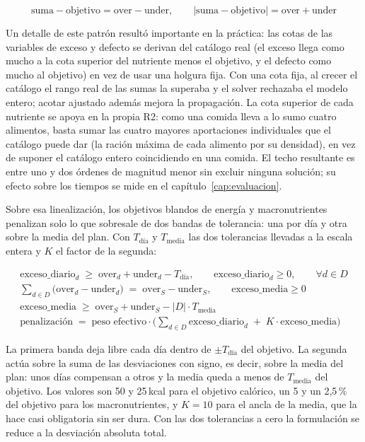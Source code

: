 \begin{equation*}
\text{suma} - \text{objetivo} = \text{over} - \text{under}, \qquad |\text{suma} - \text{objetivo}| = \text{over} + \text{under}
\end{equation*}

Un detalle de este patrón resultó importante en la práctica: las cotas de las variables de exceso y defecto se derivan del catálogo real (el exceso llega como mucho a la cota superior del nutriente menos el objetivo, y el defecto como mucho al objetivo) en vez de usar una holgura fija. Con una cota fija, al crecer el catálogo el rango real de las sumas la superaba y el solver rechazaba el modelo entero; acotar ajustado además mejora la propagación. La cota superior de cada nutriente se apoya en la propia R2: como una comida lleva a lo sumo cuatro alimentos, basta sumar las cuatro mayores aportaciones individuales que el catálogo puede dar (la ración máxima de cada alimento por su densidad), en vez de suponer el catálogo entero coincidiendo en una comida. El techo resultante es entre uno y dos órdenes de magnitud menor sin excluir ninguna solución; su efecto sobre los tiempos se mide en el capítulo~\ref{cap:evaluacion}.

Sobre esa linealización, los objetivos blandos de energía y macronutrientes penalizan solo lo que sobresale de dos bandas de tolerancia: una por día y otra sobre la media del plan. Con $T_{\text{día}}$ y $T_{\text{media}}$ las dos tolerancias llevadas a la escala entera y $K$ el factor de la segunda:

\begin{gather*}
\text{exceso\_diario}_d \;\ge\; \text{over}_d + \text{under}_d - T_{\text{día}}, \qquad \text{exceso\_diario}_d \ge 0, \qquad \forall d \in D \\
\sum_{d \in D} \big(\text{over}_d - \text{under}_d\big) \;=\; \text{over}_S - \text{under}_S, \qquad \text{exceso\_media} \ge 0 \\
\text{exceso\_media} \;\ge\; \text{over}_S + \text{under}_S - |D| \cdot T_{\text{media}} \\
\text{penalización} \;=\; \text{peso efectivo} \cdot \Big( \sum_{d \in D} \text{exceso\_diario}_d \;+\; K \cdot \text{exceso\_media} \Big)
\end{gather*}

La primera banda deja libre cada día dentro de $\pm T_{\text{día}}$ del objetivo. La segunda actúa sobre la suma de las desviaciones con signo, es decir, sobre la media del plan: unos días compensan a otros y la media queda a menos de $T_{\text{media}}$ del objetivo. Los valores son 50 y 25\,kcal para el objetivo calórico, un 5 y un 2,5\,\% del objetivo para los macronutrientes, y $K = 10$ para el ancla de la media, que la hace casi obligatoria sin ser dura. Con las dos tolerancias a cero la formulación se reduce a la desviación absoluta total.

